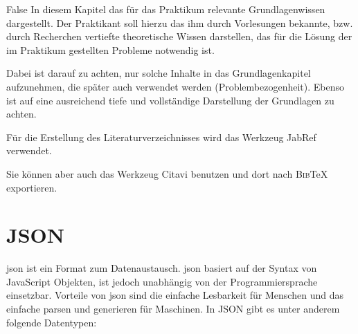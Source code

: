 \if False
In diesem Kapitel das für das Praktikum relevante Grundlagenwissen 
dargestellt. Der Praktikant soll hierzu das ihm durch Vorlesungen 
bekannte, bzw. durch Recherchen vertiefte theoretische Wissen 
darstellen, das für die Lösung der im Praktikum gestellten Probleme 
notwendig ist.

Dabei ist darauf zu achten, nur solche Inhalte in das Grundlagenkapitel 
aufzunehmen, die später auch verwendet werden (Problembezogenheit). 
Ebenso ist auf eine ausreichend tiefe und vollständige Darstellung der 
Grundlagen zu achten.

Für die Erstellung des Literaturverzeichnisses 
wird das Werkzeug JabRef\autocite{JabRef:JabRef} verwendet. 

Sie können aber auch das Werkzeug Citavi\autocite{SAS:Citavi} benutzen
und dort nach \textsc{Bib}\TeX{} exportieren.
\fi

\section{JSON}
\label{sec:json}

\ac{json} ist ein Format zum Datenaustausch.
\ac{json} basiert auf der Syntax von JavaScript Objekten, ist jedoch unabhängig von der Programmiersprache einsetzbar.
Vorteile von \ac{json} sind die einfache Lesbarkeit für Menschen und das einfache parsen und generieren für Maschinen.
In JSON gibt es unter anderem folgende Datentypen:
~\autocite{json:json}

